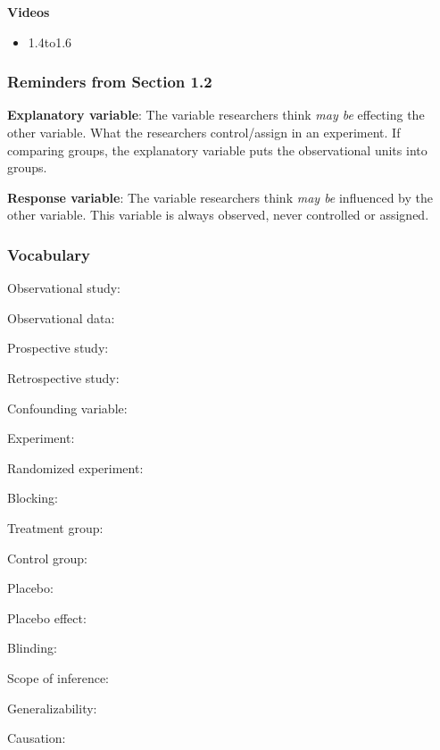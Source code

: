 \documentclass[
]{report}
\providecommand{\tightlist}{%
  \setlength{\itemsep}{0pt}\setlength{\parskip}{0pt}}
\newcommand{\rgs}{\vspace{12pt}} %
\newcommand{\rgi}{\hspace{24pt}}  %
\begin{document}
\textbf{Videos}

\begin{itemize}
\tightlist
\item
  1.4to1.6
\end{itemize}


\hypertarget{reminders-from-section-1.2}{%
\subsubsection*{Reminders from Section 1.2}\label{reminders-from-section-1.2}}

\textbf{Explanatory variable}: The variable researchers think \emph{may be} effecting the other variable. What the researchers control/assign in an experiment. If comparing groups, the explanatory variable puts the observational units into groups.

\textbf{Response variable}: The variable researchers think \emph{may be} influenced by the other variable. This variable is always observed, never controlled or assigned.

\hypertarget{vocabulary-2}{%
\subsubsection*{Vocabulary}\label{vocabulary-2}}

Observational study:
\rgs

\rgi Observational data:
\rgs

\rgi Prospective study:
\rgs

\rgi Retrospective study:
\rgs

Confounding variable:
\rgs

Experiment:
\rgs

\rgi Randomized experiment:
\rgs

\rgi Blocking:
\rgs

\rgi Treatment group:
\rgs

\rgi Control group:
\rgs

\rgi Placebo:
\rgs

\rgi Placebo effect:
\rgs

\rgi Blinding:
\rgs

Scope of inference:
\rgs

Generalizability:
\rgs

Causation:
\rgs
\end{document}
